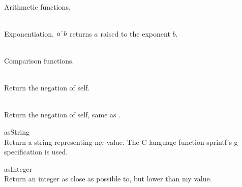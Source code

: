 \begin{desc}
  \item[\kw{function} \opd{$+$} \/\LB{}\tn{Real}\/\RB{} \returns{} \/\LB{}\tn{Real}\/\RB{}]
  \item[\kw{function} \opd{$-$} \/\LB{}\tn{Real}\/\RB{} \returns{} \/\LB{}\tn{Real}\/\RB{}]
  \item[\kw{function} \opd{$*$} \/\LB{}\tn{Real}\/\RB{} \returns{} \/\LB{}\tn{Real}\/\RB{}]
  \item[\kw{function} \opd{$/$} \/\LB{}\tn{Real}\/\RB{} \returns{} \/\LB{}\tn{Real}\/\RB{}]~\\
  Arithmetic functions.
  \item[\kw{function} \opd{$\myuparrow$} \/\LB{}\tn{Real}\/\RB{} \returns{} \/\LB{}\tn{Real}\/\RB{}]~\\
  Exponentiation. $a \myuparrow{} b$ returns $a$ raised to the exponent $b$.
  \item[\kw{function} \opd{$>$} \/\LB{}\tn{Real}\/\RB{} \returns{} \/\LB{}\tn{Boolean}\/\RB{}]
  \item[\kw{function} \opd{$>=$} \/\LB{}\tn{Real}\/\RB{} \returns{} \/\LB{}\tn{Boolean}\/\RB{}]
  \item[\kw{function} \opd{$<$} \/\LB{}\tn{Real}\/\RB{} \returns{} \/\LB{}\tn{Boolean}\/\RB{}]
  \item[\kw{function} \opd{$<=$} \/\LB{}\tn{Real}\/\RB{} \returns{} \/\LB{}\tn{Boolean}\/\RB{}]
  \item[\kw{function} \opd{$=$} \/\LB{}\tn{Real}\/\RB{} \returns{} \/\LB{}\tn{Boolean}\/\RB{}]
  \item[\kw{function} \opd{$!=$} \/\LB{}\tn{Real}\/\RB{} \returns{} \/\LB{}\tn{Boolean}\/\RB{}]~\\
  Comparison functions.
  \item[\kw{function} \opd{\tt\mytilde} \returns{} \/\LB{}\tn{Real}\/\RB{}]~\\
    Return the negation of self.
  \item[\kw{function} \opd{$-$} \returns{} \/\LB{}\tn{Real}\/\RB{}]~\\
    Return the negation of self, same as {\tt\mytilde}.
  \item[\kw{function} asString \returns{} \/\LB{}\tn{String}\/\RB{}]~\\
    Return a string representing my value.  The C language function
    sprintf's \cd{}g specification is used.
  \item[\kw{function} asInteger \returns{} \/\LB{}\tn{Integer}\/\RB{}]~\\
    Return an integer as close as possible to, but lower than my value.
\end{desc}

